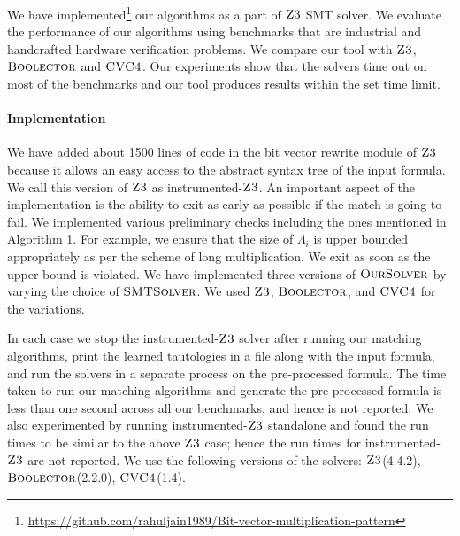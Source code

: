 %
We have implemented\footnote{\url{https://github.com/rahuljain1989/Bit-vector-multiplication-pattern}} our algorithms as a part of $\textsc{Z3}$ SMT solver.
%
We evaluate the performance of our algorithms using benchmarks that are industrial and handcrafted hardware verification problems.
%
We compare our tool with $\textsc{Z3}$, $\textsc{Boolector}$ and $\textsc{CVC4}$.
%
Our experiments show that the solvers time out on most of the benchmarks and our tool produces results within the set time limit.

\paragraph{\bf Implementation}
We have added about 1500 lines of code in the bit vector rewrite module of $\textsc{Z3}$ because it allows an easy access to the abstract syntax tree of the input formula. We call this version of $\textsc{Z3}$ as instrumented-$\textsc{Z3}$.
%
An important aspect of the implementation is the ability to exit as early as possible if the match is going to fail.
%
We implemented various preliminary checks including the ones mentioned in Algorithm 1. For example, we ensure that the size of $\Lambda_i$ is upper bounded appropriately as per the scheme of long multiplication. We exit as soon as the upper bound is violated. 
%
We have implemented three versions of $\textsc{OurSolver}$ by varying the choice of $\textsc{SMTSolver}$.
%
We used  $\textsc{Z3}$, $\textsc{Boolector}$, and $\textsc{CVC4}$ for the variations. 
%

In each case we stop the instrumented-$\textsc{Z3}$ solver after running our matching algorithms,
print the learned tautologies in a file along with the input formula, and
run the solvers in a separate process on the pre-processed formula. 
The time taken to run our matching algorithms and generate the pre-processed formula is less than one second across all our benchmarks, and hence is not reported. 
We also experimented by running instrumented-$\textsc{Z3}$ standalone and found the run times to be similar to the above $\textsc{Z3}$ case; hence the run times for instrumented-$\textsc{Z3}$ are not reported. We use the following versions of the solvers: $\textsc{Z3}$(4.4.2), $\textsc{Boolector}$(2.2.0), $\textsc{CVC4}$(1.4).

